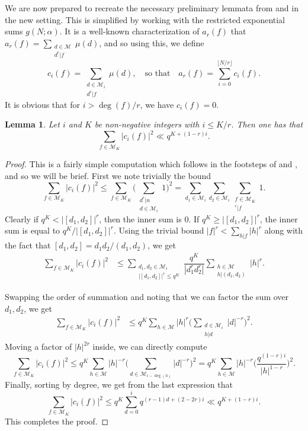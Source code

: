 \documentclass[reqno,11pt]{amsart}
\newtheorem{lemma}[theorem]{Lemma}
\theoremstyle{definition}
\theoremstyle{remark}
\numberwithin{equation}{section}
\def\calM{{\mathcal M}}
\newcommand{\<}{\begin{equation}}
\renewcommand{\>}{\end{equation}}
\begin{document}
We are now prepared to recreate the necessary preliminary lemmata from \cite{balog-ruzsa:2001} and \cite{keil:2013} in the new setting. This is simplified by working with the restricted exponential sums $g(N;\alpha)$. It is a well-known characterization of $a_r(f)$ that $a_r(f) = \sum_{\substack{d \in \calM \\ d^r|f}}\mu(d)$, and so using this, we define
\[c_i(f) = \sum_{\substack{d \in \calM_i \\ d^r|f}} \mu(d), \quad \text{so that} \quad a_r(f) = \sum_{i=0}^{\lfloor N/r \rfloor} c_i(f).\]
It is obvious that for $i>\deg(f)/r$, we have $c_i(f)=0$.
\begin{lemma}\label{c-ident}
    Let $i$ and $K$ be non-negative integers with $i \leq K/r$. Then one has that
    \[\sum_{f \in \calM_K} |c_i(f)|^2 \ll q^{K+(1-r)i}.\]
\end{lemma}
\begin{proof}
    This is a fairly simple computation which follows in the footsteps of \cite{balog-ruzsa:2001} and \cite{keil:2013}, and so we will be brief. First we note trivially the bound
    \[\sum_{f \in \calM_K} |c_i(f)|^2 \leq \sum_{f \in \calM_K} \bigg(\sum_{\substack{d^r|n \\ d \in \calM_i}} 1\bigg)^2 = \sum_{d_1 \in \calM_i} \sum_{d_2 \in \calM_i} \sum_{\substack{f \in \calM_K \\ [d_1,d_2]^r|f}}1.\]
    Clearly if $q^K<\big|[d_1,d_2]\big|^r$, then the inner sum is 0. If $q^K \geq \big|[d_1,d_2]\big|^r$, the inner sum is equal to $q^K/\big|[d_1,d_2]\big|^r$. Using the trivial bound $|f|^r < \sum_{h|f}|h|^r$ along with the fact that $[d_1,d_2] = d_1d_2/(d_1,d_2)$, we get
    \begin{align*}
        \sum_{f \in \calM_K} |c_i(f)|^2 &\leq \sum_{\substack{d_1,d_2 \in \calM_i \\ \big|[d_1,d_2]\big|^r \leq q^{K}}} \dfrac{q^K}{|d_1^rd_2^r|}\sum_{\substack{h \in \calM \\ h|(d_1,d_2)}}|h|^r.
    \end{align*}
    
    Swapping the order of summation and noting that we can factor the sum over $d_1,d_2$, we get
    \begin{align*}
        \sum_{f \in \calM_K} |c_i(f)|^2 &\leq q^K \sum_{h \in \calM} |h|^r \bigg(\sum_{\substack{d \in \calM_i \\ h|d}}|d|^{-r}\bigg)^2.
    \end{align*}
    Moving a factor of $|h|^{2r}$ inside, we can directly compute
    \[
        \sum_{f \in \calM_K} |c_i(f)|^2 \leq q^K \sum_{h \in \calM} |h|^{-r} \bigg(\sum_{d \in \calM_{i - \deg(h)}} |d|^{-r}\bigg)^2 = q^K \sum_{h \in \calM} |h|^{-r}\bigg(\dfrac{q^{(1-r)i}}{|h|^{1-r}}\bigg)^2.
    \]
    Finally, sorting by degree, we get from the last expression that
    \[
        \sum_{f \in \calM_K} |c_i(f)|^2 \leq q^K \sum_{d=0}^i q^{(r-1)d+(2-2r)i} \ll q^{K+(1-r)i}.
    \]
    This completes the proof.
\end{proof}
\end{document}
